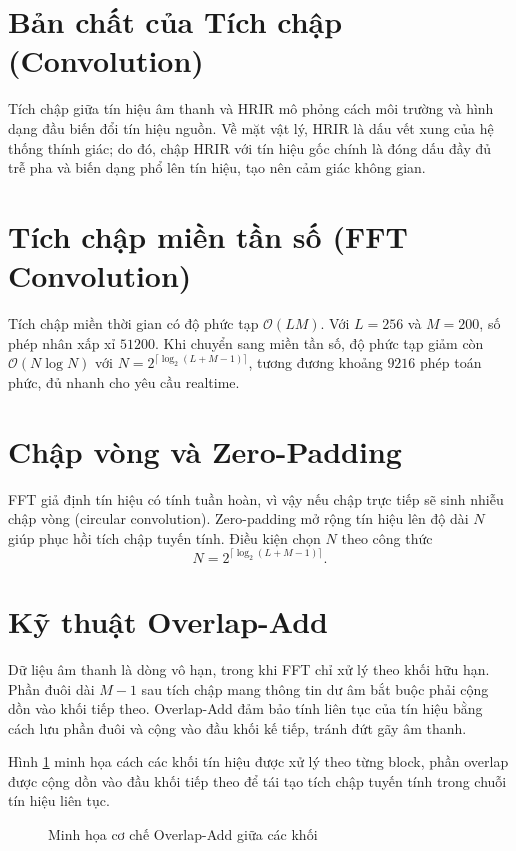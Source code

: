 \section{Bản chất của Tích chập (Convolution)}
Tích chập giữa tín hiệu âm thanh và HRIR mô phỏng cách môi trường và hình dạng đầu biến đổi tín hiệu nguồn. Về mặt vật lý, HRIR là dấu vết xung của hệ thống thính giác; do đó, chập HRIR với tín hiệu gốc chính là đóng dấu đầy đủ trễ pha và biến dạng phổ lên tín hiệu, tạo nên cảm giác không gian.

\section{Tích chập miền tần số (FFT Convolution)}
Tích chập miền thời gian có độ phức tạp $\mathcal{O}(LM)$. Với $L=256$ và $M=200$, số phép nhân xấp xỉ $51200$. Khi chuyển sang miền tần số, độ phức tạp giảm còn $\mathcal{O}(N\log N)$ với $N=2^{\lceil \log_2(L+M-1)\rceil}$, tương đương khoảng $9216$ phép toán phức, đủ nhanh cho yêu cầu realtime.

\section{Chập vòng và Zero-Padding}
FFT giả định tín hiệu có tính tuần hoàn, vì vậy nếu chập trực tiếp sẽ sinh nhiễu chập vòng (circular convolution). Zero-padding mở rộng tín hiệu lên độ dài $N$ giúp phục hồi tích chập tuyến tính. Điều kiện chọn $N$ theo công thức
\begin{equation}
    N = 2^{\lceil \log_2(L+M-1)\rceil}.
\end{equation}

\section{Kỹ thuật Overlap-Add}
Dữ liệu âm thanh là dòng vô hạn, trong khi FFT chỉ xử lý theo khối hữu hạn. Phần đuôi dài $M-1$ sau tích chập mang thông tin dư âm bắt buộc phải cộng dồn vào khối tiếp theo. Overlap-Add đảm bảo tính liên tục của tín hiệu bằng cách lưu phần đuôi và cộng vào đầu khối kế tiếp, tránh đứt gãy âm thanh.

Hình \ref{fig:overlap_add} minh họa cách các khối tín hiệu được xử lý theo từng block, phần overlap được cộng dồn vào đầu khối tiếp theo để tái tạo tích chập tuyến tính trong chuỗi tín hiệu liên tục.

\begin{figure}[H]
\centering
{}
\caption{Minh họa cơ chế Overlap-Add giữa các khối}
\label{fig:overlap_add}
\end{figure}

